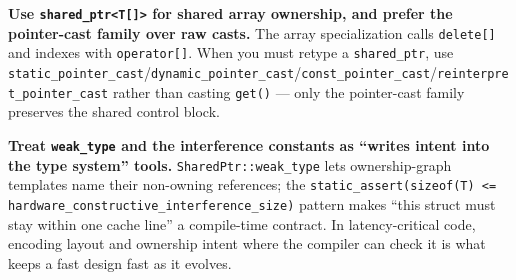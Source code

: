 \textbf{Use \texttt{shared\_ptr<T[]>} for shared array ownership, and prefer the pointer-cast family over raw casts.} The array specialization calls \texttt{delete[]} and indexes with \texttt{operator[]}. When you must retype a \texttt{shared\_ptr}, use \texttt{static\_pointer\_cast}/\texttt{dynamic\_pointer\_cast}/\texttt{const\_pointer\_cast}/\texttt{reinterpret\_pointer\_cast} rather than casting \texttt{get()} --- only the pointer-cast family preserves the shared control block.

\textbf{Treat \texttt{weak\_type} and the interference constants as ``writes intent into the type system'' tools.} \texttt{SharedPtr::weak\_type} lets ownership-graph templates name their non-owning references; the \texttt{static\_assert(sizeof(T) <= hardware\_constructive\_interference\_size)} pattern makes ``this struct must stay within one cache line'' a compile-time contract. In latency-critical code, encoding layout and ownership intent where the compiler can check it is what keeps a fast design fast as it evolves.
